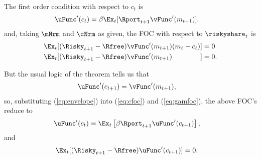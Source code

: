 \documentclass{\econtex}
\begin{document}
The first order condition with respect to $c_{t}$ is
\begin{equation}\begin{gathered}\begin{aligned}
\uFunc^{\prime}(c_{t}) & =  \beta \Ex_{t}[ \Rport_{t+1}\vFunc^{\prime}({m}_{t+1})] \label{eq:cfoc}.
\end{aligned}\end{gathered}\end{equation}
and, taking $\mNrm$ and $\cNrm$ as given, the FOC with respect to $\riskyshare_{t}$ is
\begin{equation}\begin{gathered}\begin{aligned}
\Ex_{t}[(\Risky_{t+1}-\Rfree)\vFunc^{\prime}({m}_{t+1})({m}_{t}-{c}_{t})] & =  0 
\\      \Ex_{t}[(\Risky_{t+1}-\Rfree)\vFunc^{\prime}({m}_{t+1})\phantom{({m}_{t}-{c}_{t})}] & =  0 \label{eq:gamfoc}
.
\end{aligned}\end{gathered}\end{equation}

But the usual logic of the  theorem tells us that 
\begin{equation}\begin{gathered}\begin{aligned}
\uFunc^{\prime}(c_{t+1}) & =  \vFunc^{\prime}(m_{t+1}), \label{eq:envelope}
\end{aligned}\end{gathered}\end{equation}
so, substituting (\ref{eq:envelope}) into (\ref{eq:cfoc}) and (\ref{eq:gamfoc}), the above FOC's reduce to
\begin{equation}\begin{gathered}\begin{aligned}
\uFunc^{\prime}(c_{t}) & =  \Ex_{t}\left[\beta  \Rport_{t+1} \uFunc^{\prime}({c}_{t+1})\right] \label{eq:ceuler},
\end{aligned}\end{gathered}\end{equation}
and
\begin{equation}\begin{gathered}\begin{aligned}
\Ex_{t}[(\Risky_{t+1}-\Rfree)\uFunc^{\prime}({c}_{t+1})] & =  0 \label{eq:ShareEuler}.
\end{aligned}\end{gathered}\end{equation}
\end{document}
